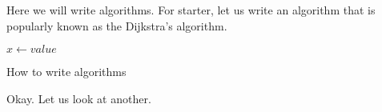 Here we will write algorithms. For starter, let us write an algorithm that is popularly known as the Dijkstra's algorithm.

\begin{algorithm}[H]
\SetAlgoLined
{}
 $x \gets value$\;
 \caption{How to write algorithms}
\end{algorithm}


Okay. Let us look at another.
